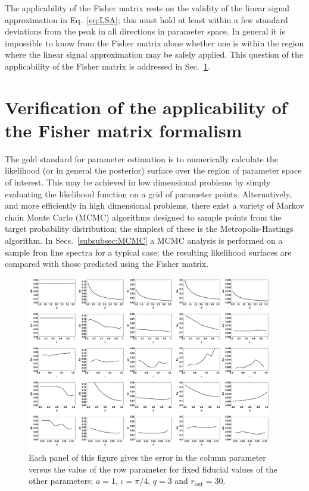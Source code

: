 The applicability of the Fisher matrix rests on the validity of the linear signal approximation in Eq.\ \ref{eq:LSA}; this must hold at least within a few standard deviations from the peak in all directions in parameter space. In general it is impossible to know from the Fisher matrix alone whether one is within the region where the linear signal approximation may be safely applied. This question of the applicability of the Fisher matrix is addressed in Sec.\ \ref{subsec:validityFish}.

\section{Verification of the applicability of the Fisher matrix formalism}\label{subsec:validityFish}
The gold standard for parameter estimation is to numerically calculate the likelihood (or in general the posterior) surface over the region of parameter space of interest. This may be achieved in low dimensional problems by simply evaluating the likelihood function on a grid of parameter points. Alternatively, and more efficiently in high dimensional problems, there exist a variety of Markov chain Monte Carlo (MCMC) algorithms designed to sample points from the target probability distribution; the simplest of these is the Metropolis-Hastings algorithm. In Secs.\ \ref{subsubsec:MCMC} a MCMC analysis is performed on a sample Iron line spectra for a typical case; the resulting likelihood surfaces are compared with those predicted using the Fisher matrix.

\begin{figure}[t]
 \centering
 \includegraphics[trim=0cm 0cm 0cm 0cm, width=0.95\textwidth]{KerrFisherMatrixErrors2.pdf}
 \caption{Each panel of this figure gives the error in the column parameter versus the value of the row parameter for fixed fiducial values of the other parameters; $a=1$, $\iota=\pi/4$, $q=3$ and $r_{\textrm{out}}=30$.}
 \label{fig:KerrFisherMatrixErrors}
\end{figure}

